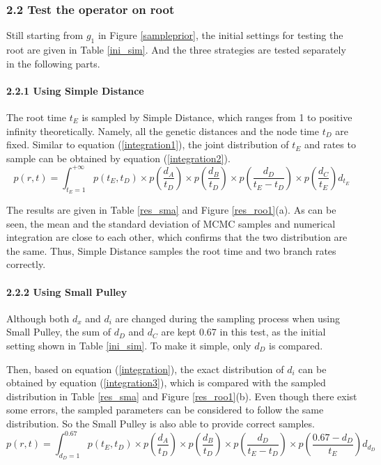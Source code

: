 \documentclass{bmcart}
\begin{document}
\begin{backmatter}
\subsubsection*{2.2 Test the operator on root}

Still starting from $g_1$ in Figure \ref{sampleprior}, the initial settings for testing the root are given in Table \ref{ini_sim}. And the three strategies are tested separately in the following parts.

\paragraph*{2.2.1 Using Simple Distance}

The root time $t_E$ is sampled by Simple Distance, which ranges from 1 to positive infinity theoretically. Namely, all the genetic distances and the node time $t_D$  are fixed. Similar to equation (\ref{integration1}), the joint distribution of $t_E$ and rates to sample can be obtained by equation (\ref{integration2}).
\begin{equation}
\label{integration2}
p(r,t) = \int_{{t_E} = 1}^{ + \infty } {p({t_E},{t_D}) \times p(\frac{{{d_A}}}{{{t_D}}}) \times p(\frac{{{d_B}}}{{{t_D}}}) \times p(\frac{{{d_D}}}{{{t_E} - {t_D}}}) \times p(\frac{{{d_C}}}{{{t_E}}}){d_{t_E}}}
\end{equation}

The results are given in Table \ref{res_sma} and Figure \ref{res_roo1}(a). As can be seen, the mean and the standard deviation of MCMC samples and numerical integration are close to each other, which confirms that the two distribution are the same. Thus, Simple Distance samples the root time and two branch rates correctly.

\paragraph*{2.2.2 Using Small Pulley}

Although both ${d_x}$ and ${d_i}$ are changed during the sampling process when using Small Pulley, the sum of ${d_D}$ and ${d_C}$ are kept 0.67 in this test, as the initial setting shown in Table \ref{ini_sim}. To make it simple, only ${d_D}$ is compared.

Then, based on equation (\ref{integration}), the exact distribution of ${d_i}$ can be obtained by equation (\ref{integration3}), which is compared with the sampled distribution in Table \ref{res_sma} and Figure \ref{res_roo1}(b). Even though there exist some errors, the sampled parameters can be considered to follow the same distribution. So the Small Pulley is also able to provide correct samples.
\begin{equation}\label{integration3}
p(r,t) = \int_{{d_D} = 1}^{0.67} {p({t_E},{t_D}) \times p(\frac{{{d_A}}}{{{t_D}}}) \times p(\frac{{{d_B}}}{{{t_D}}}) \times p(\frac{{{d_D}}}{{{t_E} - {t_D}}}) \times p(\frac{{0.67 - {d_D}}}{{{t_E}}}){d_{d_D}}}
\end{equation}


\end{backmatter}
\end{document}
